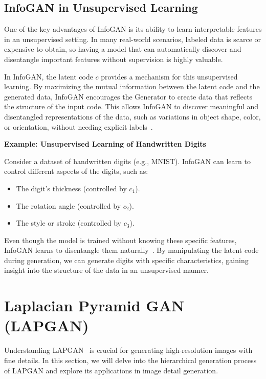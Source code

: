 \subsection{InfoGAN in Unsupervised Learning}
One of the key advantages of InfoGAN is its ability to learn interpretable features in an unsupervised setting. In many real-world scenarios, labeled data is scarce or expensive to obtain, so having a model that can automatically discover and disentangle important features without supervision is highly valuable.

In InfoGAN, the latent code \(c\) provides a mechanism for this unsupervised learning. By maximizing the mutual information between the latent code and the generated data, InfoGAN encourages the Generator to create data that reflects the structure of the input code. This allows InfoGAN to discover meaningful and disentangled representations of the data, such as variations in object shape, color, or orientation, without needing explicit labels~\cite{mugunthan2021dpd}.

\textbf{Example: Unsupervised Learning of Handwritten Digits}

Consider a dataset of handwritten digits (e.g., MNIST). InfoGAN can learn to control different aspects of the digits, such as:

\begin{itemize}
    \item The digit's thickness (controlled by \(c_1\)).
    \item The rotation angle (controlled by \(c_2\)).
    \item The style or stroke (controlled by \(c_3\)).
\end{itemize}

Even though the model is trained without knowing these specific features, InfoGAN learns to disentangle them naturally~\cite{chen2016infogan}. By manipulating the latent code during generation, we can generate digits with specific characteristics, gaining insight into the structure of the data in an unsupervised manner.










\section{Laplacian Pyramid GAN (LAPGAN)}
Understanding LAPGAN~\cite{denton2015deep} is crucial for generating high-resolution images with fine details. In this section, we will delve into the hierarchical generation process~\cite{jin2020hierarchical} of LAPGAN and explore its applications in image detail generation.

